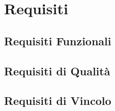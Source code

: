 \documentclass[a4paper,12pt]{article}
\begin{document}
    \section{Requisiti} {
       
        \subsection{Requisiti Funzionali} {
            
        }
        \subsection{Requisiti di Qualità} {
           
        }
        \subsection{Requisiti di Vincolo} {
           
        }
    }
\end{document}
